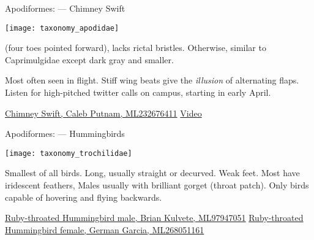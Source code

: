 \documentclass[t]{beamer}
\begin{document}
\begin{frame}[t]{Apodiformes:  — Chimney Swift}

\vspace{-\baselineskip}

\begin{multicols}{2}
\texttt{[image: taxonomy\_apodidae]}

\columnbreak

 (four toes pointed forward), lacks rictal bristles. Otherwise, similar to Caprimulgidae except dark gray and smaller. 

\vspace{\baselineskip}

Most often seen in flight. Stiff wing beats give the \textit{illusion} of alternating flaps. Listen for high-pitched twitter calls on campus, starting in early April.
\end{multicols}

\vfilll

\tiny \href{https://macaulaylibrary.org/asset/232676411}{Chimney Swift, Caleb Putnam, ML232676411} \qquad  \href{https://www.allaboutbirds.org/guide/Chimney_Swift/photo-gallery/440546}{Video}

\end{frame}

\begin{frame}[t]{Apodiformes:  — Hummingbirds}
\vspace{-0.5\baselineskip}


\texttt{[image: taxonomy\_trochilidae]}

\hangpara Smallest of all birds. Long,  usually straight or decurved. Weak feet. Most have iridescent feathers, Males usually with brilliant gorget (throat patch). Only birds capable of hovering and flying backwards.

\vfilll

\tiny \href{https://macaulaylibrary.org/asset/97947051}{Ruby-throated Hummingbird male, Brian Kulvete, ML97947051} \hfill  \href{https://macaulaylibrary.org/asset/268051161}{Ruby-throated Hummingbird female, German Garcia, ML268051161}

\end{frame}
\end{document}
